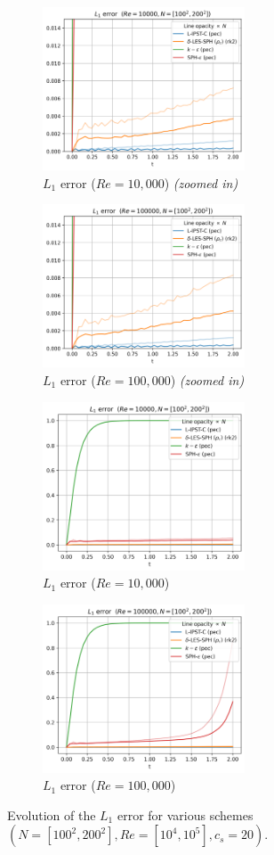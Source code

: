 \begin{figure}[htbp!]
  \begin{subfigure}{7cm}
  \centering\includegraphics[width=6cm]{Code-Figures/long-tgv/limit_l1_re_10000.png}
  \caption{$L_1$ error ($Re = 10,000$) \textit{(zoomed in)}}
  \end{subfigure}
  \begin{subfigure}{7cm}
  \centering\includegraphics[width=6cm]{Code-Figures/long-tgv/limit_l1_re_100000.png}
  \caption{$L_1$ error ($Re = 100,000$) \textit{(zoomed in)}}
  \end{subfigure}
  \begin{subfigure}{7cm}
  \centering\includegraphics[width=6cm]{Code-Figures/long-tgv/l1_re_10000.png}
  \caption{$L_1$ error ($Re = 10,000$)}
  \end{subfigure}
  \begin{subfigure}{7cm}
  \centering\includegraphics[width=6cm]{Code-Figures/long-tgv/l1_re_100000.png}
  \caption{$L_1$ error ($Re = 100,000$)}
  \end{subfigure}
  \caption{Evolution of the $L_1$ error for various schemes $(N=[100^2, 200^2], Re=[10^4, 10^5], c_s=20)$.}
  \label{fig:ltgv-l1}
\end{figure}

